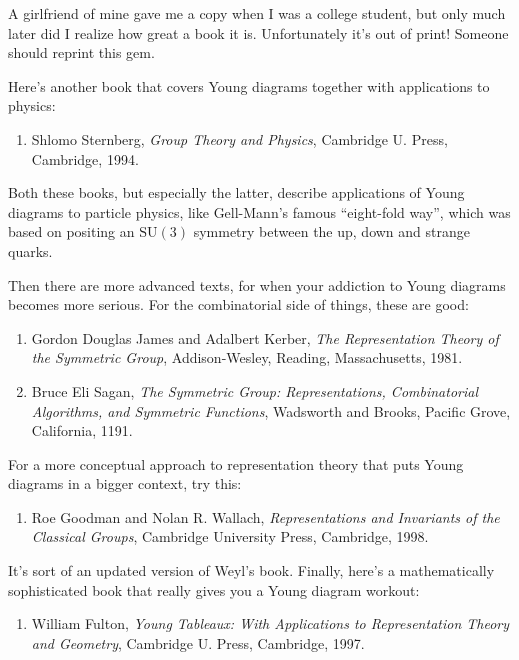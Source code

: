 \documentclass{article}
\def\tightlist{}
\begin{document}
A girlfriend of mine gave me a copy when I was a college student, but
only much later did I realize how great a book it is. Unfortunately it's
out of print! Someone should reprint this gem.

Here's another book that covers Young diagrams together with
applications to physics:

\begin{enumerate}
\def\labelenumi{\arabic{enumi})}
\setcounter{enumi}{2}
\tightlist
\item
  Shlomo Sternberg, \emph{Group Theory and Physics}, Cambridge U. Press,
  Cambridge, 1994.
\end{enumerate}

Both these books, but especially the latter, describe applications of
Young diagrams to particle physics, like Gell-Mann's famous ``eight-fold
way'', which was based on positing an \(\mathrm{SU}(3)\) symmetry
between the up, down and strange quarks.

Then there are more advanced texts, for when your addiction to Young
diagrams becomes more serious. For the combinatorial side of things,
these are good:

\begin{enumerate}
\def\labelenumi{\arabic{enumi})}
\setcounter{enumi}{3}
\item
  Gordon Douglas James and Adalbert Kerber, \emph{The Representation
  Theory of the Symmetric Group}, Addison-Wesley, Reading,
  Massachusetts, 1981.
\item
  Bruce Eli Sagan, \emph{The Symmetric Group: Representations,
  Combinatorial Algorithms, and Symmetric Functions}, Wadsworth and
  Brooks, Pacific Grove, California, 1191.
\end{enumerate}

For a more conceptual approach to representation theory that puts Young
diagrams in a bigger context, try this:

\begin{enumerate}
\def\labelenumi{\arabic{enumi})}
\setcounter{enumi}{5}
\tightlist
\item
  Roe Goodman and Nolan R. Wallach, \emph{Representations and Invariants
  of the Classical Groups}, Cambridge University Press, Cambridge, 1998.
\end{enumerate}

It's sort of an updated version of Weyl's book. Finally, here's a
mathematically sophisticated book that really gives you a Young diagram
workout:

\begin{enumerate}
\def\labelenumi{\arabic{enumi})}
\setcounter{enumi}{6}
\tightlist
\item
  William Fulton, \emph{Young Tableaux: With Applications to
  Representation Theory and Geometry}, Cambridge U. Press, Cambridge,
  1997.
\end{enumerate}
\end{document}
